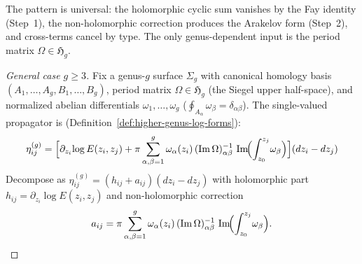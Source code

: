 \begin{remark}\label{rem:genus2-summary}
The pattern is universal: the holomorphic cyclic sum vanishes by the Fay identity (Step~1), the non-holomorphic correction produces the Arakelov form (Step~2), and cross-terms cancel by type. The only genus-dependent input is the period matrix $\Omega \in \mathfrak{H}_g$.
\end{remark}

\begin{proof}[General case $g \geq 3$]
Fix a genus-$g$ surface $\Sigma_g$ with canonical homology basis
$(A_1,\ldots,A_g, B_1,\ldots,B_g)$, period matrix
$\Omega \in \mathfrak{H}_g$ (the Siegel upper half-space),
and normalized abelian differentials $\omega_1,\ldots,\omega_g$
($\oint_{A_\alpha}\omega_\beta = \delta_{\alpha\beta}$).
The single-valued propagator is
(Definition~\ref{def:higher-genus-log-forms}):
\begin{equation}\label{eq:propagator-general-g}
\eta_{ij}^{(g)} = \Bigl[\partial_{z_i}\!\log E(z_i, z_j)
 + \pi \sum_{\alpha,\beta=1}^{g}
 \omega_\alpha(z_i)\,(\operatorname{Im}\Omega)^{-1}_{\alpha\beta}\,
 \operatorname{Im}\!\Bigl(\int_{z_0}^{z_j}\!\omega_\beta\Bigr)
\Bigr](dz_i - dz_j)
\end{equation}
Decompose as $\eta_{ij}^{(g)} = (h_{ij} + a_{ij})(dz_i - dz_j)$
with holomorphic part $h_{ij} = \partial_{z_i}\!\log E(z_i, z_j)$
and non-holomorphic correction
\begin{equation}\label{eq:a-ij-general}
a_{ij} = \pi \sum_{\alpha,\beta=1}^{g}
 \omega_\alpha(z_i)\,(\operatorname{Im}\Omega)^{-1}_{\alpha\beta}\,
 \operatorname{Im}\!\Bigl(\int_{z_0}^{z_j}\!\omega_\beta\Bigr).
\end{equation}


\end{proof}
